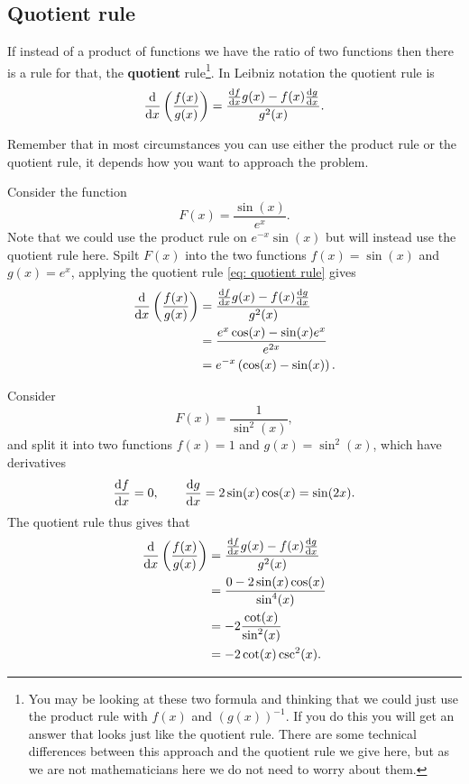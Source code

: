 \subsection*{Quotient rule}
If instead of a product of functions we have the ratio of two functions then there is a rule for that, the \textbf{quotient} rule\footnote{You may be looking at these two formula and thinking that we could just use the product rule with $f(x)$ and $(g(x))^{-1}$. If you do this you will get an answer that looks just like the quotient rule. There are some technical differences between this approach and the quotient rule we give here, but as we are not mathematicians here we do not need to worry about them. }. In Leibniz notation the quotient rule is 
\begin{equation}
\frac{\mathrm{d} }{\mathrm{d} x}\left(\frac{f(x)}{g(x)}\right)=\frac{\frac{\mathrm{d} f}{\mathrm{d} x}g(x)-f(x)\frac{\mathrm{d} g}{\mathrm{d} x}}{g^{2}(x)}. \label{eq: quotient rule}
\end{equation}

Remember that in most circumstances you can use either the product rule or the quotient rule, it depends how you want to approach the problem.\\

\begin{ex}
Consider the function
\begin{equation*}
F(x)=\frac{\sin(x)}{e^{x}}.
\end{equation*}
Note that we could use the product rule on $e^{-x}\sin(x)$ but will instead use the quotient rule here. Spilt $F(x)$ into the two functions $f(x)=\sin(x)$ and $g(x)=e^{x}$, applying the quotient rule \cref{eq: quotient rule} gives
\begin{align*}
\frac{\mathrm{d} }{\mathrm{d} x}\left(\frac{f(x)}{g(x)}\right)&=\frac{\frac{\mathrm{d} f}{\mathrm{d} x}g(x)-f(x)\frac{\mathrm{d} g}{\mathrm{d} x}}{g^{2}(x)}\\
							&=\frac{e^{x}\cos(x)-\sin(x)e^{x}}{e^{2x}}\\
							&=e^{-x}\left(\cos(x)-\sin(x)\right).
\end{align*}
\end{ex}

\begin{ex}
Consider 
\begin{equation*}
F(x)=\frac{1}{\sin^{2}(x)},
\end{equation*}
and split it into two functions $f(x)=1$ and $g(x)=\sin^{2}(x)$, which have derivatives
\begin{equation*}
\frac{\mathrm{d} f}{\mathrm{d} x}=0, \qquad \frac{\mathrm{d} g}{\mathrm{d} x}=2\sin(x)\cos(x)=\sin(2x).
\end{equation*}
The quotient rule thus gives that
\begin{align*}
\frac{\mathrm{d} }{\mathrm{d} x}\left(\frac{f(x)}{g(x)}\right)&=\frac{\frac{\mathrm{d} f}{\mathrm{d} x}g(x)-f(x)\frac{\mathrm{d} g}{\mathrm{d} x}}{g^{2}(x)}\\
							&=\frac{0-2\sin(x)\cos(x)}{\sin^{4}(x)}\\
							&=-2\frac{\cot(x)}{\sin^{2}(x)}\\
							&=-2\cot(x)\csc^{2}(x).
\end{align*}
\end{ex}

